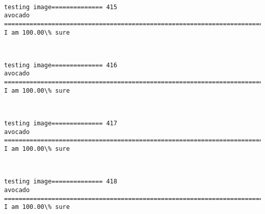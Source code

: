\documentclass[11pt]{article}
\begin{document}
    \begin{center}
    \end{center}
    { \hspace*{\fill} \\}
    
    \begin{Verbatim}[commandchars=\\\{\}]
testing image============== 415
avocado
============================================================================
I am 100.00\% sure

    \end{Verbatim}

    \begin{center}
    \end{center}
    { \hspace*{\fill} \\}
    
    \begin{Verbatim}[commandchars=\\\{\}]
testing image============== 416
avocado
============================================================================
I am 100.00\% sure

    \end{Verbatim}

    \begin{center}
    \end{center}
    { \hspace*{\fill} \\}
    
    \begin{Verbatim}[commandchars=\\\{\}]
testing image============== 417
avocado
============================================================================
I am 100.00\% sure

    \end{Verbatim}

    \begin{center}
    \end{center}
    { \hspace*{\fill} \\}
    
    \begin{Verbatim}[commandchars=\\\{\}]
testing image============== 418
avocado
============================================================================
I am 100.00\% sure

    \end{Verbatim}
\end{document}
